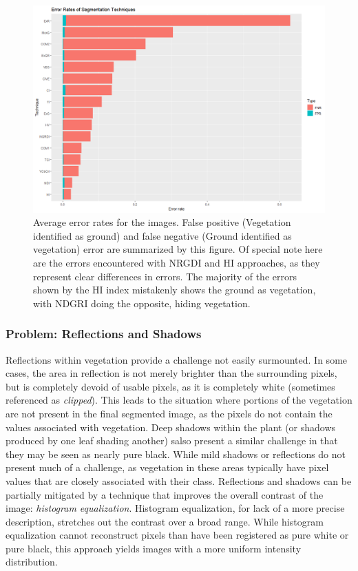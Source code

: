 \documentclass[letterpaper]{report}
\begin{document}
{%
\begin{figure}[h]
	\centering
	\includegraphics[width=.75\linewidth]{figures/segmentation-error-rates.png}
	\caption[Error rates of segmentation algorithms]{Average error rates for the images. False positive (Vegetation identified as ground) and false negative (Ground identified as vegetation) error are summarized by this figure. Of special note here are the errors encountered with NRGDI and HI approaches, as they represent clear differences in errors. The majority of the errors shown by the HI index mistakenly shows the ground as vegetation, with NDGRI  doing the opposite, hiding vegetation.}
	\label{fig:segmentation-errors}
\end{figure}

\subsubsection{Problem: Reflections and Shadows}
Reflections within vegetation provide a challenge not easily surmounted.  In some cases, the area in reflection is not merely brighter than the surrounding pixels, but is completely devoid of usable pixels, as it is completely white (sometimes referenced as \textit{clipped}). This leads to the situation where portions of the vegetation are not present in the final segmented image, as the pixels do not contain the values associated with vegetation.  Deep shadows within the plant (or shadows produced by one leaf shading another) salso present a similar challenge in that they may be seen as nearly pure black. While mild shadows or reflections do not present much of a challenge, as vegetation in these areas typically have pixel values that are closely associated with their class. Reflections and shadows can be partially mitigated by a technique that improves the overall contrast of the image: \textit{histogram equalization}. Histogram equalization, for lack of a more precise description, stretches out the contrast over a broad range. While histogram equalization cannot reconstruct pixels than have been registered as pure white or pure black, this approach yields images with a more uniform intensity distribution.

}
\end{document}

